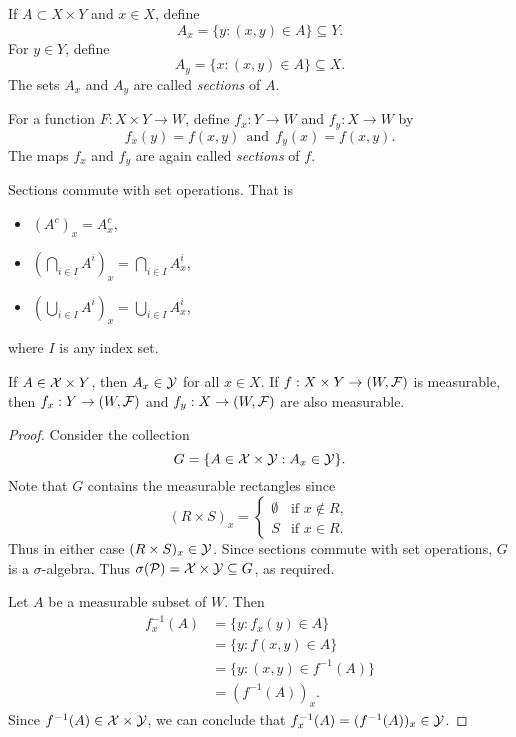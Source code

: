 \begin{defn}
    If $A \subset X \times Y$ and $x \in X$, define
    \[A_x = \{y:(x,y) \in A\} \subseteq Y. \]
    For $y \in Y$, define
    \[A_y = \{x : (x,y) \in A\} \subseteq X.\]
    The sets $A_x$ and $A_y$ are called \emph{sections} of $A$. 
\end{defn}
\begin{defn}
    For a function $F:X \times Y \to W$, define $f_x : Y \to W$ and $f_y : X \to W$ by 
    \[f_x(y) = f(x,y) ~~\text{and}~~f_y(x) = f(x,y). \]
    The maps $f_x$ and $f_y$ are again called \emph{sections} of $f$.
\end{defn}
\begin{prop}
    Sections commute with set operations. That is
    \begin{itemize}
        \item $(A^c)_x = A_x^c$,
        \item $\left(\bigcap_{i \in I} A^i\right)_x = \bigcap_{i \in I} A^i_x$,
        \item $\left(\bigcup_{i \in I} A^i\right)_x = \bigcup_{i \in I} A^i_x$,
    \end{itemize}
    where $I$ is any index set.
\end{prop}
\begin{prop}
    If $A \in {\mathcal{X}} \times Y$, then $A_x \in \mathcal{Y}$ for all $x \in X$. If $f:X \times Y \to (W,{\mathcal{F}})$ is measurable, then $f_x:Y \to (W,{\mathcal{F}})$ and $f_y : X \to (W,{\mathcal{F}})$ are also measurable.
\end{prop}
\begin{proof}
    Consider the collection 
    \[G = \{A \in {\mathcal{X}} \times \mathcal{Y} : A_x \in \mathcal{Y}\}. \]
    Note that $G$ contains the measurable rectangles since 
    \[(R\times S)_x = \begin{cases}
        \emptyset& \text{if } x \notin R,\\
        S & \text{if } x \in R.
    \end{cases}\]
    Thus in either case $(R \times S)_x \in \mathcal{Y}$. Since sections commute with set operations, $G$ is a $\sigma$-algebra. Thus $\sigma({\mathcal{P}}) = {\mathcal{X}} \times \mathcal{Y} \subseteq G$, as required.

    Let $A$ be a measurable subset of $W$. Then 
    \begin{align*}
        f_x^{-1}(A) &=\{y:f_x(y) \in A\}\\
        &= \{y:f(x,y) \in A\}\\
        &=\{y: (x,y) \in f^{-1}(A)\}\\
        &=(f^{-1}(A))_x.
    \end{align*}
    Since $f^{-1}(A) \in {\mathcal{X}} \times \mathcal{Y}$, we can conclude that $f_x^{-1}(A) = (f^{-1}(A))_x \in \mathcal{Y}$.
\end{proof}
